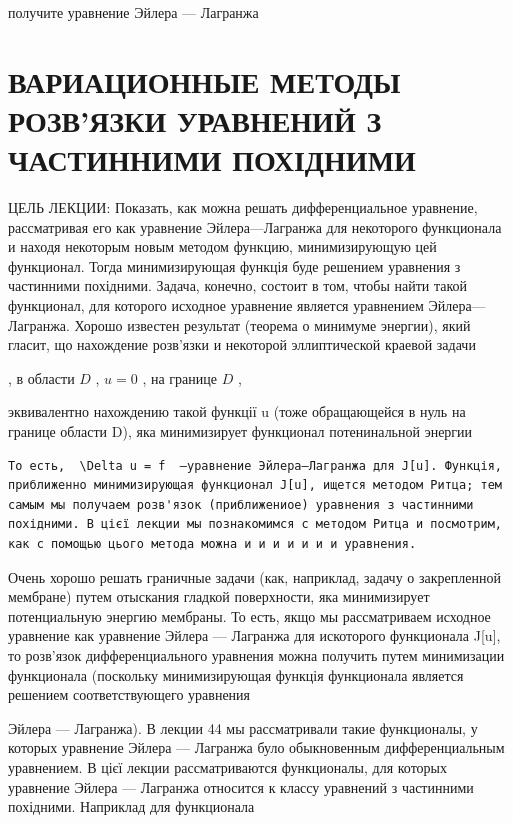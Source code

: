 \documentclass[
  ukrainian,
]{article}
\begin{document}
получите уравнение Эйлера --- Лагранжа

\section{ВАРИАЦИОННЫЕ МЕТОДЫ РОЗВ'ЯЗКИ УРАВНЕНИЙ З ЧАСТИННИМИ
ПОХІДНИМИ}\label{ux432ux430ux440ux438ux430ux446ux438ux43eux43dux43dux44bux435-ux43cux435ux442ux43eux434ux44b-ux440ux43eux437ux432ux44fux437ux43aux438-ux443ux440ux430ux432ux43dux435ux43dux438ux439-ux437-ux447ux430ux441ux442ux438ux43dux43dux438ux43cux438-ux43fux43eux445ux456ux434ux43dux438ux43cux438}

ЦЕЛЬ ЛЕКЦИИ: Показать, как можна решать дифференциальное уравнение,
рассматривая его как уравнение Эйлера---Лагранжа для некоторого
функционала и находя некоторым новым методом функцию, минимизирующую цей
функционал. Тогда минимизирующая функція буде решением уравнения з
частинними похідними. Задача, конечно, состоит в том, чтобы найти такой
функционал, для которого исходное уравнение является уравнением
Эйлера---Лагранжа. Хорошо известен результат (теорема о минимуме
энергии), який гласит, що нахождение розв'язки и некоторой эллиптической
краевой задачи

, в области \(D\) , \(u = 0\) , на границе \(D\) ,

эквивалентно нахождению такой функції u (тоже обращающейся в нуль на
границе области D), яка минимизирует функционал потенинальной энергии

\begin{verbatim}
То есть,  \Delta u = f  —уравнение Эйлера—Лагранжа для J[u]. Функція, приближенно минимизирующая функционал J[u], ищется методом Ритца; тем самым мы получаем розв'язок (приближениое) уравнения з частинними похідними. В цієї лекции мы познакомимся с методом Ритца и посмотрим, как с помощью цього метода можна и и и и и и и уравнения.
\end{verbatim}

Очень хорошо решать граничные задачи (как, наприклад, задачу о
закрепленной мембране) путем отыскания гладкой поверхности, яка
минимизирует потенциальную энергию мембраны. То есть, якщо мы
рассматриваем исходное уравнение как уравнение Эйлера --- Лагранжа для
искоторого функционала J{[}u{]}, то розв'язок дифференциального
уравнения можна получить путем минимизации функционала (поскольку
минимизирующая функція функционала является решением соответствующего
уравнения

Эйлера --- Лагранжа). В лекции 44 мы рассматривали такие функционалы, у
которых уравнение Эйлера --- Лагранжа було обыкновенным дифференциальным
уравнением. В цієї лекции рассматриваются функционалы, для которых
уравнение Эйлера --- Лагранжа относится к классу уравнений з частинними
похідними. Наприклад для функционала
\end{document}
